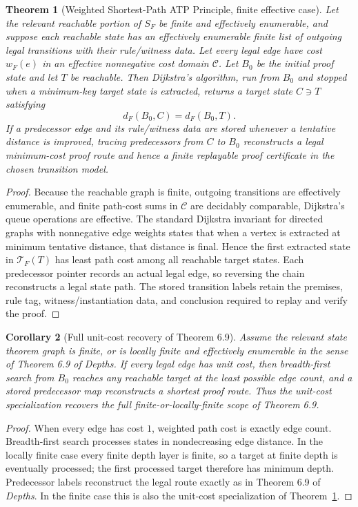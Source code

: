 \documentclass[11pt]{article}
\newtheorem{theorem}{Theorem}[section]
\newtheorem{corollary}[theorem]{Corollary}
\theoremstyle{definition}
\theoremstyle{remark}
\begin{document}
\begin{theorem}[Weighted Shortest-Path ATP Principle, finite effective case]\label{thm:weighted-sp}
Let the relevant reachable portion of $S_F$ be finite and effectively enumerable, and suppose each reachable state has an effectively enumerable finite list of outgoing legal transitions with their rule/witness data. Let every legal edge have cost $w_F(e)$ in an effective nonnegative cost domain $\mathcal C$. Let $B_0$ be the initial proof state and let $T$ be reachable. Then Dijkstra's algorithm, run from $B_0$ and stopped when a minimum-key target state is extracted, returns a target state $C\ni T$ satisfying
\[
d_F(B_0,C)=d_F(B_0,T).
\]
If a predecessor edge and its rule/witness data are stored whenever a tentative distance is improved, tracing predecessors from $C$ to $B_0$ reconstructs a legal minimum-cost proof route and hence a finite replayable proof certificate in the chosen transition model.
\end{theorem}

\begin{proof}
Because the reachable graph is finite, outgoing transitions are effectively enumerable, and finite path-cost sums in $\mathcal C$ are decidably comparable, Dijkstra's queue operations are effective. The standard Dijkstra invariant for directed graphs with nonnegative edge weights states that when a vertex is extracted at minimum tentative distance, that distance is final. Hence the first extracted state in $\mathcal T_F(T)$ has least path cost among all reachable target states. Each predecessor pointer records an actual legal edge, so reversing the chain reconstructs a legal state path. The stored transition labels retain the premises, rule tag, witness/instantiation data, and conclusion required to replay and verify the proof.
\end{proof}

\begin{corollary}[Full unit-cost recovery of Theorem 6.9]\label{cor:depths69}
Assume the relevant state theorem graph is finite, or is locally finite and effectively enumerable in the sense of Theorem 6.9 of \emph{Depths}. If every legal edge has unit cost, then breadth-first search from $B_0$ reaches any reachable target at the least possible edge count, and a stored predecessor map reconstructs a shortest proof route. Thus the unit-cost specialization recovers the full finite-or-locally-finite scope of Theorem 6.9.
\end{corollary}

\begin{proof}
When every edge has cost $1$, weighted path cost is exactly edge count. Breadth-first search processes states in nondecreasing edge distance. In the locally finite case every finite depth layer is finite, so a target at finite depth is eventually processed; the first processed target therefore has minimum depth. Predecessor labels reconstruct the legal route exactly as in Theorem 6.9 of \emph{Depths}. In the finite case this is also the unit-cost specialization of Theorem~\ref{thm:weighted-sp}.
\end{proof}
\end{document}
